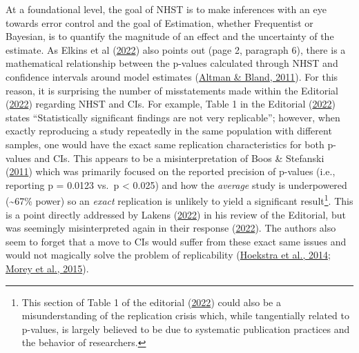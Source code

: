 \documentclass[]{cik}%
\begin{document}
At a foundational level, the goal of NHST is to make inferences with an
eye towards error control and the goal of Estimation, whether
Frequentist or Bayesian, is to quantify the magnitude of an effect and
the uncertainty of the estimate. As Elkins et al
(\protect\hyperlink{ref-elkins2022}{2022}) also points out (page 2,
paragraph 6), there is a mathematical relationship between the p-values
calculated through NHST and confidence intervals around model estimates
(\protect\hyperlink{ref-altman2011}{Altman \& Bland, 2011}). For this
reason, it is surprising the number of misstatements made within the
Editorial (\protect\hyperlink{ref-elkins2022}{2022}) regarding NHST and
CIs. For example, Table 1 in the Editorial
(\protect\hyperlink{ref-elkins2022}{2022}) states ``Statistically
significant findings are not very replicable''; however, when exactly
reproducing a study repeatedly in the same population with different
samples, one would have the exact same replication characteristics for
both p-values and CIs. This appears to be a misinterpretation of Boos \&
Stefanski (\protect\hyperlink{ref-boos}{2011}) which was primarily
focused on the reported precision of p-values (i.e., reporting p =
0.0123 vs.~p \textless{} 0.025) and how the \emph{average} study is
underpowered (\textasciitilde67\% power) so an \emph{exact} replication
is unlikely to yield a significant result\footnote{This section of Table
  1 of the editorial (\protect\hyperlink{ref-elkins2022}{2022}) could
  also be a misunderstanding of the replication crisis which, while
  tangentially related to p-values, is largely believed to be due to
  systematic publication practices and the behavior of researchers.}.
This is a point directly addressed by Lakens
(\protect\hyperlink{ref-lakensres}{2022}) in his review of the
Editorial, but was seemingly misinterpreted again in their response
(\protect\hyperlink{ref-elkinsres}{2022}). The authors also seem to
forget that a move to CIs would suffer from these exact same issues and
would not magically solve the problem of replicability
(\protect\hyperlink{ref-hoekstra2014}{Hoekstra et al., 2014};
\protect\hyperlink{ref-morey2015}{Morey et al., 2015}).
\end{document}

